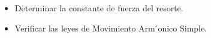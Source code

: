 \documentclass[../main.tex]{subfiles}
\begin{document}
\begin{itemize}
    \item Determinar la constante de fuerza del resorte.
    \item Verificar las leyes de Movimiento Arm ́onico Simple.
\end{itemize}
\end{document}
